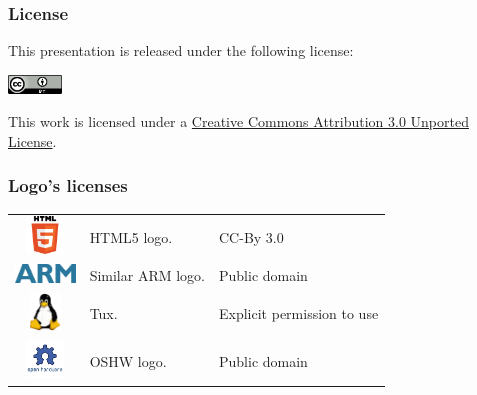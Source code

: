 \documentclass[slidestop,compress,mathserif]{beamer}
\begin{document}
\begin{frame}
  \frametitle{License}
  This presentation is released under the following license:
  
  \begin{block}{}
    \begin{center}
      \includegraphics[height=0.5cm]{images/cc-by.png}
  
      This work is licensed under a \href{http://creativecommons.org/licenses/by/3.0/deed.en_US}{Creative Commons Attribution 3.0 Unported License}.
    \end{center}
  \end{block}
\end{frame}

\begin{frame}
  \frametitle{Logo's licenses}
  \begin{tabularx}{\textwidth}{clX}
    \href{http://www.w3.org/html/logo/downloads/HTML5_Logo_512.png}{\includegraphics[height=1cm]{images/HTML5-logo.png}} & HTML5 logo. & CC-By 3.0 \\
    \href{http://upload.wikimedia.org/wikipedia/commons/thumb/6/60/ARM_logo.svg/200px-ARM_logo.svg.png}{\includegraphics[height=0.5cm]{images/ARM-logo.png}} & Similar ARM logo. & Public domain \\
    \href{http://upload.wikimedia.org/wikipedia/commons/a/af/Tux.png}{\includegraphics[height=1cm]{images/Tux.png}} & Tux. & Explicit permission to use \\
    \href{http://oshwlogo.com/logos/ohw-logo.png}{\includegraphics[height=1cm]{images/ohw-logo.png}} & OSHW logo. & Public domain \\    
  \end{tabularx}
\end{frame}
\end{document}
